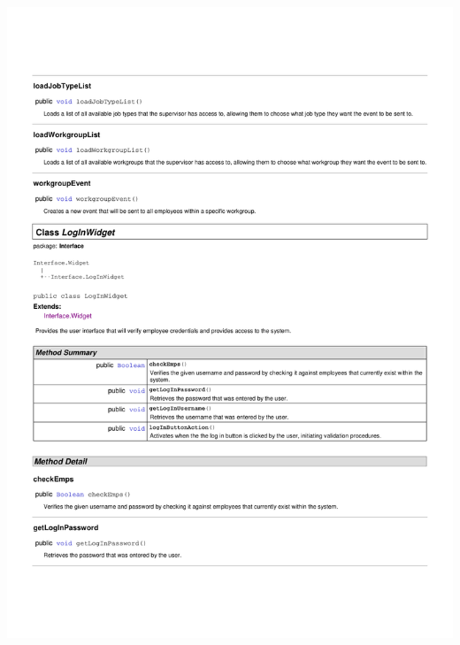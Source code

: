 \documentclass[letterpaper,12pt]{report}
\begin{document}
\includegraphics[scale=0.9,trim=20mm 30mm 25mm 25mm]{externals/InterfaceDataDictionary4.pdf}
\newpage
\end{document}
